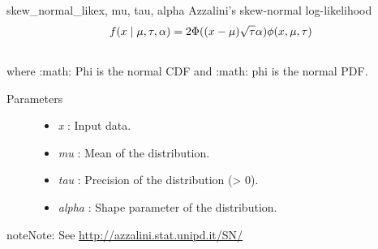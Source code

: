 \hypertarget{pymc.distributions.skew_normal_like}{}\begin{funcdesc}{skew\_normal\_like}{x, mu, tau, alpha}
Azzalini's skew-normal log-likelihood
\begin{gather}
\begin{split}f(x \mid \mu, \tau, \alpha) = 2 \Phi((x-\mu)\sqrt{\tau}\alpha) \phi(x,\mu,\tau)\end{split}\notag\\\begin{split}\end{split}\notag
\end{gather}
where :math: Phi is the normal CDF and :math: phi is the normal PDF.
\begin{description}
\item[Parameters] \leavevmode\begin{itemize}
\item {}
\emph{x} : Input data.

\item {}
\emph{mu} : Mean of the distribution.

\item {}
\emph{tau} : Precision of the distribution (\textgreater{} 0).

\item {}
\emph{alpha} : Shape parameter of the distribution.

\end{itemize}

\end{description}

\begin{notice}{note}{Note:}
See \href{http://azzalini.stat.unipd.it/SN/}{http://azzalini.stat.unipd.it/SN/}
\end{notice}
\end{funcdesc}

